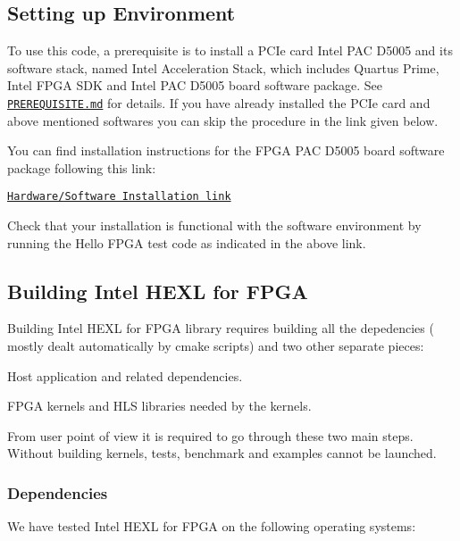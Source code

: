 \subsection*{Setting up Environment}

To use this code, a prerequisite is to install a P\-C\-Ie card Intel P\-A\-C D5005 and its software stack, named Intel Acceleration Stack, which includes Quartus Prime, Intel F\-P\-G\-A S\-D\-K and Intel P\-A\-C D5005 board software package. See \href{PREREQUISITE.md}{\tt P\-R\-E\-R\-E\-Q\-U\-I\-S\-I\-T\-E.\-md} for details. If you have already installed the P\-C\-Ie card and above mentioned softwares you can skip the procedure in the link given below. \par


You can find installation instructions for the F\-P\-G\-A P\-A\-C D5005 board software package following this link\-: \par
 \href{https://www.intel.com/content/www/us/en/programmable/documentation/edj1542148561811.html}{\tt Hardware/\-Software Installation link}

Check that your installation is functional with the software environment by running the Hello F\-P\-G\-A test code as indicated in the above link. \par


\subsection*{Building Intel H\-E\-X\-L for F\-P\-G\-A}

Building Intel H\-E\-X\-L for F\-P\-G\-A library requires building all the depedencies ( mostly dealt automatically by cmake scripts) and two other separate pieces\-:
\begin{DoxyItemize}
\item Host application and related dependencies.
\item F\-P\-G\-A kernels and H\-L\-S libraries needed by the kernels.
\end{DoxyItemize}

From user point of view it is required to go through these two main steps. Without building kernels, tests, benchmark and examples cannot be launched.

\subsubsection*{Dependencies}

We have tested Intel H\-E\-X\-L for F\-P\-G\-A on the following operating systems\-: \par

